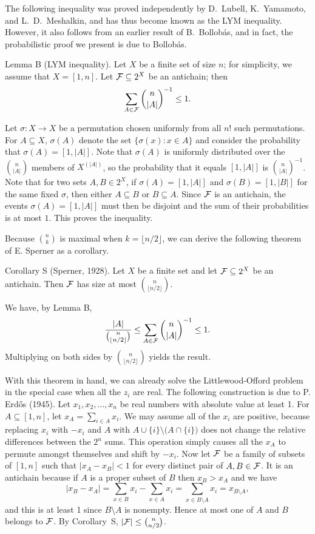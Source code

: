 The following inequality was proved independently by D.~Lubell, K.~Yamamoto, and L.~D.~Meshalkin,
and has thus become known as the LYM inequality. However, it also follows from an earlier result of B.~Bollob\'as,
and in fact, the probabilistic proof we present is due to Bollob\'as.

\parenproclaim Lemma B (LYM inequality). Let $X$ be a finite set of size $n$;
for simplicity, we assume that $X = [1,n]$. Let ${\cal F}\subseteq 2^X$ be an antichain; then
$$\sum_{A\in {\cal F}} {n\choose |A|}^{-1} \leq 1.$$

\proof Let $\sigma : X\to X$ be a permutation chosen uniformly from all $n!$ such permutations. For
$A\subseteq X$, $\sigma(A)$ denote the set $\{\sigma(x) : x\in A\}$ and consider the probability that
$\sigma(A) = [1,|A|]$. Note that $\sigma(A)$ is uniformly distributed over the ${n\choose |A|}$ members of
$X^{(|A|)}$, so the probability that it equals $[1,|A|]$ is ${n\choose |A|}^{-1}$. Note that for two sets
$A,B\in 2^X$, if $\sigma(A) = [1,|A|]$ and $\sigma(B) = [1,|B|]$ for the same fixed $\sigma$,
then either $A\subseteq B$ or $B\subseteq
A$. Since ${\cal F}$ is an antichain, the events $\sigma(A) = [1,|A|]$ must then be disjoint and the sum of their
probabilities is at most $1$. This proves the inequality.\slug

Because ${n \choose k}$ is maximal when $k = \lfloor n/2\rfloor$, we can derive the following theorem of
E. Sperner as a corollary.

\parenproclaim Corollary S (Sperner, {\rm 1928}).
Let $X$ be a finite set and let ${\cal F}\subseteq 2^X$ be an antichain. Then ${\cal F}$ has size at most ${n\choose \lfloor n/2\rfloor}$.

\proof We have, by Lemma B,
$${|A|\over {n\choose \lfloor n/2\rfloor}} \leq \sum_{A\in {\cal F}} {n\choose |A|}^{-1} \leq 1.$$
Multiplying on both sides by ${n\choose \lfloor n/2\rfloor}$ yields the result.\slug

With this theorem in hand, we can already solve the Littlewood-Offord problem in the special case
when all the $z_i$ are real. The
following construction is due to P. Erd\H os (1945). Let $x_1, x_2, \ldots, x_n$ be real numbers with absolute
value at least 1. For $A\subseteq [1,n]$, let $x_A = \sum_{i\in A}x_i$. We may assume all of the $x_i$ are
positive, because replacing $x_i$ with $-x_i$ and $A$ with $A \cup \{i\} \setminus \big(A\cap \{i\}\big)$ does not
change the relative differences between the $2^n$ sums.
This operation simply causes all the $x_A$ to permute amongst themselves and shift by $-x_i$. Now let ${\cal F}$
be a family of subsets of $[1,n]$ such that $|x_A-x_B|<1$ for every distinct pair of $A,B\in {\cal F}$. It is an
antichain because if $A$ is a proper subset of $B$ then $x_B>x_A$ and we have
$$|x_B - x_A| = \sum_{x\in B}x_i - \sum_{x\in A}x_i = \sum_{x\in B\setminus A}x_i = x_{B\setminus A},$$
and this is at least 1 since $B\setminus A$ is nonempty.
Hence at most one of $A$ and $B$ belongs to ${\cal F}$. By Corollary~S, $|{\cal F}|\leq {n\choose n/2}$.

